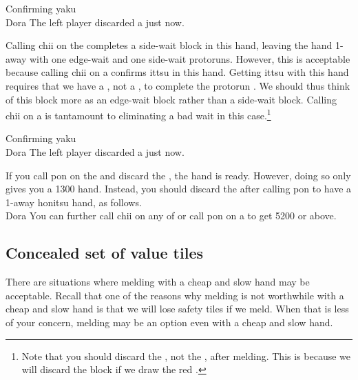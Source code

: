 \bigskip
\begin{itembox}[r]{Confirming {\jap yaku}}
\bp
{}\rfs{}~~\\
\hspace{295pt}\footnotesize{\jap Dora}
\ep
\vspace{-20pt}The left player discarded a {\large{}} just now.
\end{itembox}
\noindent
Calling {\jap chii} on the {\large{}} completes a side-wait block in this hand, leaving the hand 1-away with one edge-wait and one side-wait protoruns. 
However, this is acceptable because calling {\jap chii} on a {\large{}} confirms {\jap ittsu} in this hand. Getting {\jap ittsu} with this hand requires that we have a {\large{}}, not a {\large{}}, to complete the protorun {\large{}}. We should thus think of this block more as an edge-wait block rather than a side-wait block. Calling {\jap chii} on a {\large{}} is tantamount to eliminating a bad wait in this case.\footnote{Note that you should discard the , not the , after melding. This is because we will discard the {} block if we draw the red \rfw.}

\bigskip
\begin{itembox}[r]{Confirming {\jap yaku}}
\bp
{}\dong\dong\dong\nan\nan~~\fa\\
\hspace{295pt}\footnotesize{\jap Dora}
\ep {}
\vspace{-20pt}The left player discarded a {\large{}} just now.
\end{itembox}
\noindent
If you call {\jap pon} on the {\large{}} and discard the {\large{}}, the hand is ready. However, doing so only gives you a 1300 hand. Instead, you should discard the {\large{}} after calling {\jap pon} to have a 1-away {\jap honitsu} hand, as follows.
\bp
{}\dong\dong\dong\nan\nan~~~\fa\\
\hspace{310pt}\footnotesize{\jap Dora}
\ep
You can further call {\jap chii} on any of {\large{}} or call {\jap pon} on a {\large\nan} to get 5200 or above. 

\subsection{Concealed set of value tiles}
There are situations where melding with a cheap and slow hand may be acceptable. Recall that one of the reasons why melding is not worthwhile with a cheap and slow hand is that we will lose safety tiles if we meld. When that is less of your concern, melding may be an option even with a cheap and slow hand. 

